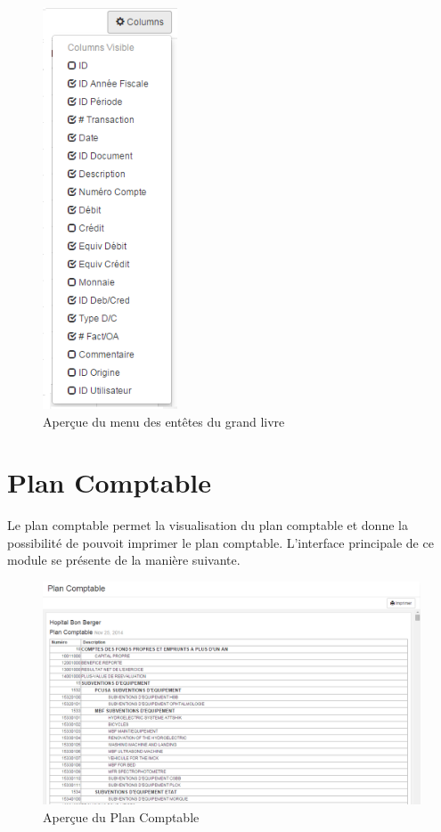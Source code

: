 \documentclass[12pt,a4paper]{report}
\begin{document}
\begin{figure}[h]
\begin{center}
\includegraphics[width=4cm]{pic/ListeGrandLivre.png}
\end{center}
\caption{Aperçue du menu des entêtes du grand livre}
\label{Aperçue du menu des entêtes du grand livre}
\end{figure}

\newpage
\section{Plan Comptable}
Le plan comptable permet la visualisation du plan comptable et donne la possibilité de pouvoit imprimer le plan comptable. L'interface principale de ce module se présente de la manière suivante. 

\begin{figure}[h]
\begin{center}
\includegraphics[width=14cm]{pic/PlanComptableAf.png}
\end{center}
\caption{Aperçue du Plan Comptable}
\label{Aperçue du Plan Comptable}
\end{figure}
\end{document}

